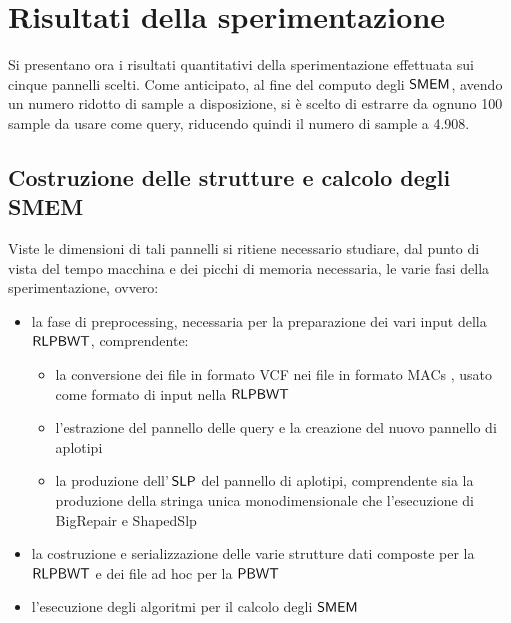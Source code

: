 \section{Risultati della sperimentazione}
Si presentano ora i risultati quantitativi della sperimentazione effettuata sui
cinque pannelli scelti. Come anticipato, al fine del computo degli $\mbox{\rm {\sf SMEM}}$,
avendo un numero 
ridotto di sample a disposizione, si è scelto di estrarre da ognuno 100 sample
da usare come query, riducendo quindi il numero di sample a 4.908.
\subsection{Costruzione delle strutture e calcolo degli SMEM}
Viste le dimensioni di tali pannelli si ritiene necessario studiare, dal punto
di vista del tempo macchina e dei picchi di memoria necessaria, le varie fasi
della sperimentazione, ovvero:
\begin{itemize}
  \item la fase di preprocessing, necessaria per la preparazione dei
  vari input della $\mbox{\rm {\sf RLPBWT}}$, comprendente: 
  \begin{itemize}
    \item la conversione dei file in formato VCF nei file in formato MACs
    \cite{macs}, usato 
    come formato di input nella $\mbox{\rm {\sf RLPBWT}}$
    \item l'estrazione del pannello delle query e la creazione del nuovo
    pannello di aplotipi
    \item la produzione dell'$\,\mbox{\rm {\sf SLP}}$ del pannello di aplotipi, comprendente
    sia la produzione della stringa unica monodimensionale che l'esecuzione di
    BigRepair e ShapedSlp
  \end{itemize}
  \item la costruzione e serializzazione delle varie strutture dati composte per
  la $\mbox{\rm {\sf RLPBWT}}$ e dei file ad hoc per la $\mbox{\rm {\sf PBWT}}$
  \item l'esecuzione degli algoritmi per il calcolo degli $\mbox{\rm {\sf SMEM}}$
\end{itemize}
